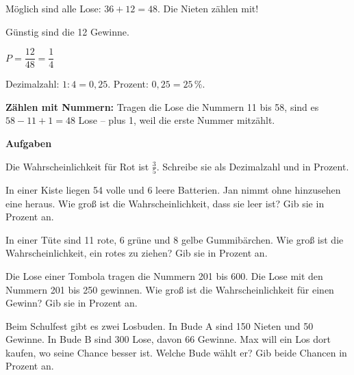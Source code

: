 \documentclass[11pt]{article}
\newcommand{\aufg}[3]{\par\noindent\makebox[0pt][r]{#3}\begin{minipage}[t]{\linewidth}#1\end{minipage}\par}
\newcommand{\nr}[1]{\makebox[7mm][l]{\textbf{#1}}}
\newlength{\kr}
\begin{document}
\noindent\par\noindent{}Möglich sind alle Lose: $36 + 12 = 48$. Die Nieten zählen mit!\par\smallskip\par\noindent{}Günstig sind die 12 Gewinne.\par\smallskip\par\noindent{}$P = \dfrac{12}{48} = \dfrac{1}{4}$\par\smallskip\par\noindent{}Dezimalzahl: $1 : 4 = 0{,}25$. Prozent: $0{,}25 = 25\,\%$.\par\smallskip\par\noindent{}\textbf{Zählen mit Nummern:} Tragen die Lose die Nummern 11 bis 58, sind es $58 - 11 + 1 = 48$ Lose – plus 1, weil die erste Nummer mitzählt.\par\smallskip\par\medskip
\noindent\textbf{Aufgaben}\par\smallskip
\aufg{\nr{1.}Die Wahrscheinlichkeit für Rot ist $\frac{3}{5}$. Schreibe sie als Dezimalzahl und in Prozent.}{}{}
\medskip
\aufg{\nr{2.}In einer Kiste liegen 54 volle und 6 leere Batterien. Jan nimmt ohne hinzusehen eine heraus. Wie groß ist die Wahrscheinlichkeit, dass sie leer ist? Gib sie in Prozent an.}{}{}
\medskip
\aufg{\nr{3.}In einer Tüte sind 11 rote, 6 grüne und 8 gelbe Gummibärchen. Wie groß ist die Wahrscheinlichkeit, ein rotes zu ziehen? Gib sie in Prozent an.}{}{}
\medskip
\aufg{\nr{4.}Die Lose einer Tombola tragen die Nummern 201 bis 600. Die Lose mit den Nummern 201 bis 250 gewinnen. Wie groß ist die Wahrscheinlichkeit für einen Gewinn? Gib sie in Prozent an.}{}{}
\medskip
\aufg{\nr{5.}Beim Schulfest gibt es zwei Losbuden. In Bude A sind 150 Nieten und 50 Gewinne. In Bude B sind 300 Lose, davon 66 Gewinne. Max will ein Los dort kaufen, wo seine Chance besser ist. Welche Bude wählt er? Gib beide Chancen in Prozent an.}{}{{\scriptsize\color{mbgrau}Ziel\hspace{2mm}}}
\medskip
\par\vspace{3mm}\setlength{\kr}{\dimexpr\pagegoal-\pagetotal-10mm\relax}%
\end{document}
